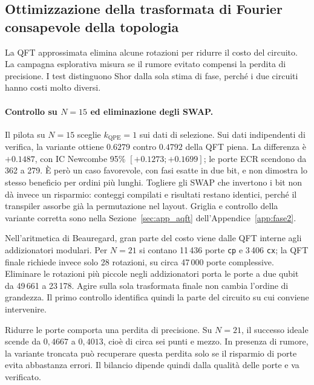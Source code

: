 \begin{onehalfspace}

\section[Ottimizzazione topologica della QFT]{Ottimizzazione della trasformata di Fourier consapevole della topologia}
\label{sec:qft_topologia}

La QFT approssimata elimina alcune rotazioni per ridurre il costo del circuito. La campagna esplorativa misura se il rumore evitato compensi la perdita di precisione. I test distinguono Shor dalla sola stima di fase, perché i due circuiti hanno costi molto diversi.

\paragraph{Controllo su $N=15$ ed eliminazione degli SWAP.}
Il pilota su $N=15$ sceglie $k_{\mathrm{QPE}}=1$ sui dati di selezione. Sui dati indipendenti di verifica, la variante ottiene $0.6279$ contro $0.4792$ della QFT piena. La differenza è $+0.1487$, con IC Newcombe 95\% $[+0.1273;+0.1699]$; le porte ECR scendono da 362 a 279. È però un caso favorevole, con fasi esatte in due bit, e non dimostra lo stesso beneficio per ordini più lunghi. Togliere gli SWAP che invertono i bit non dà invece un risparmio: conteggi compilati e risultati restano identici, perché il transpiler assorbe già la permutazione nel layout. Griglia e controllo della variante corretta sono nella Sezione~\ref{sec:app_aqft} dell'Appendice~\ref{app:fase2}.

Nell'aritmetica di Beauregard, gran parte del costo viene dalle QFT interne agli addizionatori modulari. Per $N=21$ si contano 11\,436 porte \texttt{cp} e 3\,406 \texttt{cx}; la QFT finale richiede invece solo 28 rotazioni, su circa 47\,000 porte complessive. Eliminare le rotazioni più piccole negli addizionatori porta le porte a due qubit da 49\,661 a 23\,178. Agire sulla sola trasformata finale non cambia l'ordine di grandezza. Il primo controllo identifica quindi la parte del circuito su cui conviene intervenire.

Ridurre le porte comporta una perdita di precisione. Su $N=21$, il successo ideale scende da $0{,}4667$ a $0{,}4013$, cioè di circa sei punti e mezzo. In presenza di rumore, la variante troncata può recuperare questa perdita solo se il risparmio di porte evita abbastanza errori. Il bilancio dipende quindi dalla qualità delle porte e va verificato.


\end{onehalfspace}
